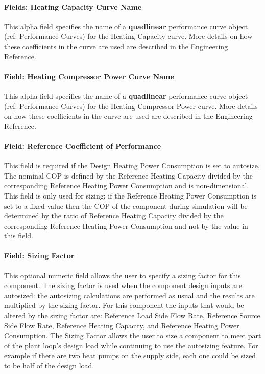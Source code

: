\paragraph{Fields: Heating Capacity Curve Name}\label{fields-heating-capacity-curve-name}

This alpha field specifies the name of a \textbf{quadlinear} performance curve object (ref: Performance Curves) for the Heating Capacity curve. More details on how these coefficients in the curve are used are described in the Engineering Reference.

\paragraph{Field: Heating Compressor Power Curve Name}\label{field-heating-compressor-power-curve-name}

This alpha field specifies the name of a \textbf{quadlinear} performance curve object (ref: Performance Curves) for the Heating Compressor Power curve. More details on how these coefficients in the curve are used are described in the Engineering Reference.

\paragraph{Field: Reference Coefficient of Performance}\label{field-heating-nom-COP}

This field is required if the Design Heating Power Consumption is set to autosize.  The nominal COP is defined by the Reference Heating Capacity divided by the corresponding Reference Heating Power Consumption and is non-dimensional.  This field is only used for sizing; if the Reference Heating Power Consumption is set to a fixed value then the COP of the component during simulation will be determined by the ratio of Reference Heating Capacity divided by the corresponding Reference Heating Power Consumption and not by the value in this field.

\paragraph{Field: Sizing Factor}\label{field-heating-siz-fac}

This optional numeric field allows the user to specify a sizing factor for this component. The
sizing factor is used when the component design inputs are autosized: the autosizing calculations
are performed as usual and the results are multiplied by the sizing factor. For this component
the inputs that would be altered by the sizing factor are: Reference Load Side Flow Rate, Reference Source Side Flow Rate, Reference Heating Capacity, and Reference Heating Power Consumption. The Sizing Factor allows the user to size
a component to meet part of the plant loop's design load while continuing to use the autosizing feature.  For example if there are two heat pumps on the supply side, each one could be sized to be half of the design load.

